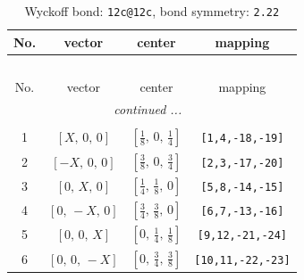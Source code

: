 \documentclass[fleqn,8pt]{jsarticle}
\begin{document}
\begin{longtable}{cccc}
\caption{Wyckoff bond: {\tt 12c@12c}, bond symmetry: {\tt 2.22}}
 \\
 \hline \hline
No. & vector & center & mapping \\ \hline \endfirsthead

\multicolumn{3}{l}{\tablename\ \thetable{}} \\
 \hline \hline
No. & vector & center & mapping \\ \hline \endhead

 \hline \hline
\multicolumn{3}{r}{\footnotesize\it continued ...} \\ \endfoot

 \hline \hline
\multicolumn{3}{r}{} \\ \endlastfoot

1 & $\left[ X,\, 0,\, 0 \right]$ & $\left[ \frac{1}{8},\, 0,\, \frac{1}{4} \right]$ & {\tt [1,4,-18,-19]} \\ \hline
2 & $\left[ - X,\, 0,\, 0 \right]$ & $\left[ \frac{3}{8},\, 0,\, \frac{3}{4} \right]$ & {\tt [2,3,-17,-20]} \\ \hline
3 & $\left[ 0,\, X,\, 0 \right]$ & $\left[ \frac{1}{4},\, \frac{1}{8},\, 0 \right]$ & {\tt [5,8,-14,-15]} \\ \hline
4 & $\left[ 0,\, - X,\, 0 \right]$ & $\left[ \frac{3}{4},\, \frac{3}{8},\, 0 \right]$ & {\tt [6,7,-13,-16]} \\ \hline
5 & $\left[ 0,\, 0,\, X \right]$ & $\left[ 0,\, \frac{1}{4},\, \frac{1}{8} \right]$ & {\tt [9,12,-21,-24]} \\ \hline
6 & $\left[ 0,\, 0,\, - X \right]$ & $\left[ 0,\, \frac{3}{4},\, \frac{3}{8} \right]$ & {\tt [10,11,-22,-23]} \\
\end{longtable}
\renewcommand{\arraystretch}{1.2}
\end{document}
